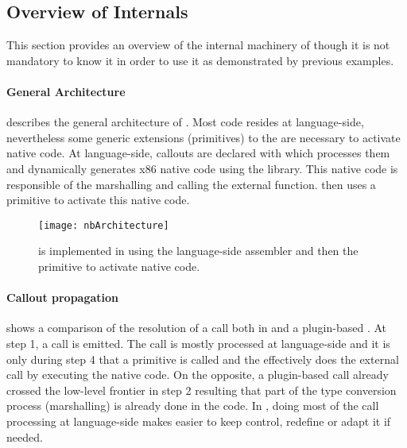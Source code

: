 \subsection{Overview of \NBFFI Internals}

This section provides an overview of the internal machinery of \NBFFI though it is not mandatory to know it in order to use it as demonstrated by previous examples.

\paragraph{General Architecture}
 describes the general architecture of \NB.
Most code resides at language-side, nevertheless some generic extensions (primitives) to the \VM are necessary to activate native code.
At language-side, callouts are declared with \NBFFI which processes them and dynamically generates x86 native code using the  library.
This native code is responsible of the marshalling and calling the external function.
\NB then uses a primitive to activate this native code.

\begin{figure}[ht]
	\centering
	\texttt{[image: nbArchitecture]}
	\caption[\NB Components Layering]{
	\NB is implemented in \PH using the language-side assembler and then the \B primitive to activate native code.}
\end{figure}

\paragraph{Callout propagation}
 shows a comparison of the resolution of a \FFI call both in \NBFFI and a plugin-based \FFI.
At step 1, a \FFI call is emitted.
The \NBFFI call is mostly processed at language-side and it is only during step 4 that a primitive is called and the \VM effectively does the external call by executing the native code.
On the opposite, a plugin-based \FFI call already crossed the low-level frontier in step 2 resulting that part of the type conversion process (marshalling) is already done in the \VM code.
In \NBFFI, doing most of the \FFI call processing at language-side makes easier to keep control, redefine or adapt it if needed.

